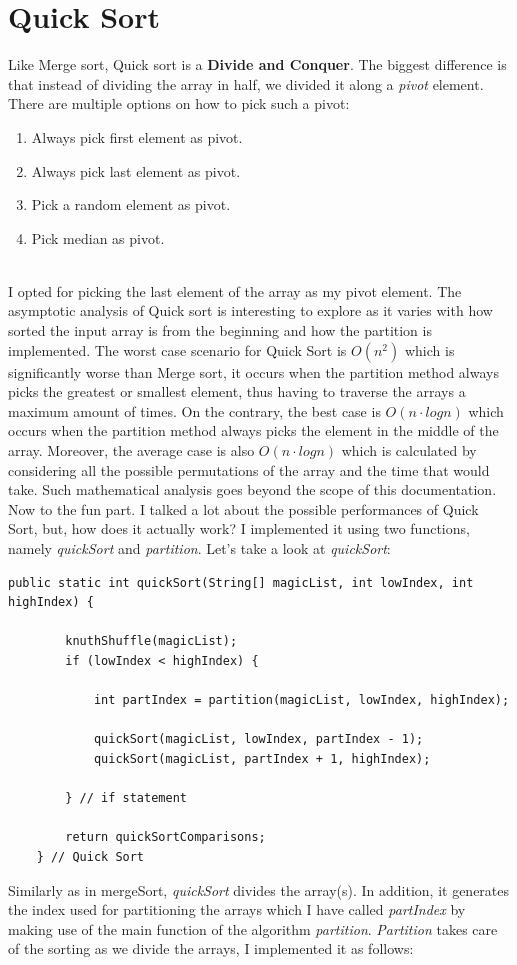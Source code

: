 \documentclass[letterpaper, 10pt]{article}
\begin{document}
\section{Quick Sort}
Like Merge sort, Quick sort is a \textbf{Divide and Conquer}. The biggest difference is that instead of dividing the array in half, we divided it along a \textit{pivot} element. There are multiple options on how to pick such a pivot: 
\begin{enumerate}
    \item Always pick first element as pivot.
    \item Always pick last element as pivot.
    \item Pick a random element as pivot.
    \item Pick median as pivot.
\end{enumerate}
\\
I opted for picking the last element of the array as my pivot element. The asymptotic analysis of Quick sort is interesting to explore as it varies with how sorted the input array is from the beginning and how the partition is implemented. The worst case scenario for Quick Sort is $O(n^2)$ which is significantly worse than Merge sort, it occurs when the partition method always picks the greatest or smallest element, thus having to traverse the arrays a maximum amount of times. On the contrary, the best case is $O(n\cdot log n)$ which occurs when the partition method always picks the element in the middle of the array. Moreover, the average case is also $O(n\cdot log n)$ which is calculated by considering all the possible permutations of the array and the time that would take. Such mathematical analysis goes beyond the scope of this documentation. Now to the fun part. I talked a lot about the possible performances of Quick Sort, but, how does it actually work? I implemented it using two functions, namely \textit{quickSort} and \textit{partition}. Let's take a look at \textit{quickSort}:

\begin{lstlisting}
public static int quickSort(String[] magicList, int lowIndex, int highIndex) {
		
		knuthShuffle(magicList);
		if (lowIndex < highIndex) {
			
			int partIndex = partition(magicList, lowIndex, highIndex);
			
			quickSort(magicList, lowIndex, partIndex - 1);
			quickSort(magicList, partIndex + 1, highIndex);
			
		} // if statement

		return quickSortComparisons;
	} // Quick Sort
\end{lstlisting}
Similarly as in mergeSort, \textit{quickSort} divides the array(s). In addition, it generates the index used for partitioning the arrays which I have called \textit{partIndex} by making use of the main function of the algorithm \textit{partition}. \textit{Partition} takes care of the sorting as we divide the arrays, I implemented it as follows:
\end{document}
